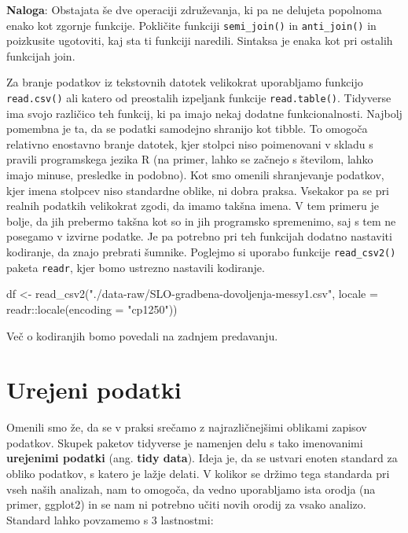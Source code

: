 \documentclass[
]{book}
\newenvironment{Shaded}{\begin{snugshade}}{\end{snugshade}}
\newcommand{\AttributeTok}[1]{\textcolor[rgb]{0.77,0.63,0.00}{#1}}
\newcommand{\FunctionTok}[1]{\textcolor[rgb]{0.00,0.00,0.00}{#1}}
\newcommand{\NormalTok}[1]{#1}
\newcommand{\OtherTok}[1]{\textcolor[rgb]{0.56,0.35,0.01}{#1}}
\newcommand{\SpecialCharTok}[1]{\textcolor[rgb]{0.00,0.00,0.00}{#1}}
\newcommand{\StringTok}[1]{\textcolor[rgb]{0.31,0.60,0.02}{#1}}
\begin{document}
\textbf{Naloga}: Obstajata še dve operaciji združevanja, ki pa ne delujeta popolnoma enako kot zgornje funkcije. Pokličite funkciji \texttt{semi\_join()} in \texttt{anti\_join()} in poizkusite ugotoviti, kaj sta ti funkciji naredili. Sintaksa je enaka kot pri ostalih funkcijah join.

Za branje podatkov iz tekstovnih datotek velikokrat uporabljamo funkcijo \texttt{read.csv()} ali katero od preostalih izpeljank funkcije \texttt{read.table()}. Tidyverse ima svojo različico teh funkcij, ki pa imajo nekaj dodatne funkcionalnosti. Najbolj pomembna je ta, da se podatki samodejno shranijo kot tibble. To omogoča relativno enostavno branje datotek, kjer stolpci niso poimenovani v skladu s pravili programskega jezika R (na primer, lahko se začnejo s številom, lahko imajo minuse, presledke in podobno). Kot smo omenili shranjevanje podatkov, kjer imena stolpcev niso standardne oblike, ni dobra praksa. Vsekakor pa se pri realnih podatkih velikokrat zgodi, da imamo takšna imena. V tem primeru je bolje, da jih prebermo takšna kot so in jih programsko spremenimo, saj s tem ne posegamo v izvirne podatke. Je pa potrebno pri teh funkcijah dodatno nastaviti kodiranje, da znajo prebrati šumnike. Poglejmo si uporabo funkcije \texttt{read\_csv2()} paketa \texttt{readr}, kjer bomo ustrezno nastavili kodiranje.

\begin{Shaded}
\begin{Highlighting}[]
\NormalTok{df }\OtherTok{\textless{}{-}} \FunctionTok{read\_csv2}\NormalTok{(}\StringTok{"./data{-}raw/SLO{-}gradbena{-}dovoljenja{-}messy1.csv"}\NormalTok{,}
                \AttributeTok{locale =}\NormalTok{ readr}\SpecialCharTok{::}\FunctionTok{locale}\NormalTok{(}\AttributeTok{encoding =} \StringTok{"cp1250"}\NormalTok{))}
\end{Highlighting}
\end{Shaded}

Več o kodiranjih bomo povedali na zadnjem predavanju.

\hypertarget{urejeni-podatki}{%
\section{Urejeni podatki}\label{urejeni-podatki}}

Omenili smo že, da se v praksi srečamo z najrazličnejšimi oblikami zapisov podatkov. Skupek paketov tidyverse je namenjen delu s tako imenovanimi \textbf{urejenimi podatki} (ang. \textbf{tidy data}). Ideja je, da se ustvari enoten standard za obliko podatkov, s katero je lažje delati. V kolikor se držimo tega standarda pri vseh naših analizah, nam to omogoča, da vedno uporabljamo ista orodja (na primer, ggplot2) in se nam ni potrebno učiti novih orodij za vsako analizo. Standard lahko povzamemo s 3 lastnostmi:
\end{document}
